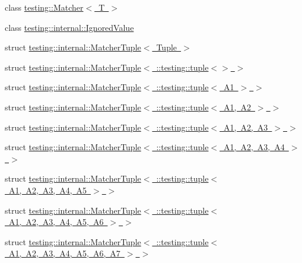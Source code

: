 \begin{DoxyCompactItemize}
\item 
class \mbox{\hyperlink{classtesting_1_1Matcher}{testing\+::\+Matcher$<$ T $>$}}
\item 
class \mbox{\hyperlink{classtesting_1_1internal_1_1IgnoredValue}{testing\+::internal\+::\+Ignored\+Value}}
\item 
struct \mbox{\hyperlink{structtesting_1_1internal_1_1MatcherTuple}{testing\+::internal\+::\+Matcher\+Tuple$<$ Tuple $>$}}
\item 
struct \mbox{\hyperlink{structtesting_1_1internal_1_1MatcherTuple_3_01_1_1testing_1_1tuple_3_4_01_4}{testing\+::internal\+::\+Matcher\+Tuple$<$ \+::testing\+::tuple$<$$>$ $>$}}
\item 
struct \mbox{\hyperlink{structtesting_1_1internal_1_1MatcherTuple_3_01_1_1testing_1_1tuple_3_01A1_01_4_01_4}{testing\+::internal\+::\+Matcher\+Tuple$<$ \+::testing\+::tuple$<$ A1 $>$ $>$}}
\item 
struct \mbox{\hyperlink{structtesting_1_1internal_1_1MatcherTuple_3_01_1_1testing_1_1tuple_3_01A1_00_01A2_01_4_01_4}{testing\+::internal\+::\+Matcher\+Tuple$<$ \+::testing\+::tuple$<$ A1, A2 $>$ $>$}}
\item 
struct \mbox{\hyperlink{structtesting_1_1internal_1_1MatcherTuple_3_01_1_1testing_1_1tuple_3_01A1_00_01A2_00_01A3_01_4_01_4}{testing\+::internal\+::\+Matcher\+Tuple$<$ \+::testing\+::tuple$<$ A1, A2, A3 $>$ $>$}}
\item 
struct \mbox{\hyperlink{structtesting_1_1internal_1_1MatcherTuple_3_01_1_1testing_1_1tuple_3_01A1_00_01A2_00_01A3_00_01A4_01_4_01_4}{testing\+::internal\+::\+Matcher\+Tuple$<$ \+::testing\+::tuple$<$ A1, A2, A3, A4 $>$ $>$}}
\item 
struct \mbox{\hyperlink{structtesting_1_1internal_1_1MatcherTuple_3_01_1_1testing_1_1tuple_3_01A1_00_01A2_00_01A3_00_01A4_00_01A5_01_4_01_4}{testing\+::internal\+::\+Matcher\+Tuple$<$ \+::testing\+::tuple$<$ A1, A2, A3, A4, A5 $>$ $>$}}
\item 
struct \mbox{\hyperlink{structtesting_1_1internal_1_1MatcherTuple_3_01_1_1testing_1_1tuple_3_01A1_00_01A2_00_01A3_00_01A4_00_01A5_00_01A6_01_4_01_4}{testing\+::internal\+::\+Matcher\+Tuple$<$ \+::testing\+::tuple$<$ A1, A2, A3, A4, A5, A6 $>$ $>$}}
\item 
struct \mbox{\hyperlink{structtesting_1_1internal_1_1MatcherTuple_3_01_1_1testing_1_1tuple_3_01A1_00_01A2_00_01A3_00_01A63c742e825c64dbe2671b0a407b3db47}{testing\+::internal\+::\+Matcher\+Tuple$<$ \+::testing\+::tuple$<$ A1, A2, A3, A4, A5, A6, A7 $>$ $>$}}

\end{DoxyCompactItemize}
